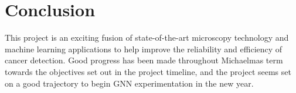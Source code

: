 \section{Conclusion}
This project is an exciting fusion of state-of-the-art microscopy technology and machine learning applications to help improve the reliability and efficiency of cancer detection. Good progress has been made throughout Michaelmas term towards the objectives set out in the project timeline, and the project seems set on a good trajectory to begin GNN experimentation in the new year.